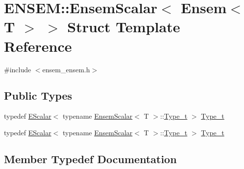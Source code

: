 \hypertarget{structENSEM_1_1EnsemScalar_3_01Ensem_3_01T_01_4_01_4}{}\section{E\+N\+S\+EM\+:\+:Ensem\+Scalar$<$ Ensem$<$ T $>$ $>$ Struct Template Reference}
\label{structENSEM_1_1EnsemScalar_3_01Ensem_3_01T_01_4_01_4}


{\ttfamily \#include $<$ensem\+\_\+ensem.\+h$>$}

\subsection*{Public Types}
\begin{DoxyCompactItemize}
\item 
typedef \mbox{\hyperlink{classENSEM_1_1EScalar}{E\+Scalar}}$<$ typename \mbox{\hyperlink{structENSEM_1_1EnsemScalar}{Ensem\+Scalar}}$<$ T $>$\+::\mbox{\hyperlink{structENSEM_1_1EnsemScalar_3_01Ensem_3_01T_01_4_01_4_a7452a3e2409e2d8a2ae3ea41eec32972}{Type\+\_\+t}} $>$ \mbox{\hyperlink{structENSEM_1_1EnsemScalar_3_01Ensem_3_01T_01_4_01_4_a7452a3e2409e2d8a2ae3ea41eec32972}{Type\+\_\+t}}
\item 
typedef \mbox{\hyperlink{classENSEM_1_1EScalar}{E\+Scalar}}$<$ typename \mbox{\hyperlink{structENSEM_1_1EnsemScalar}{Ensem\+Scalar}}$<$ T $>$\+::\mbox{\hyperlink{structENSEM_1_1EnsemScalar_3_01Ensem_3_01T_01_4_01_4_a7452a3e2409e2d8a2ae3ea41eec32972}{Type\+\_\+t}} $>$ \mbox{\hyperlink{structENSEM_1_1EnsemScalar_3_01Ensem_3_01T_01_4_01_4_a7452a3e2409e2d8a2ae3ea41eec32972}{Type\+\_\+t}}
\end{DoxyCompactItemize}


\subsection{Member Typedef Documentation}
\mbox{\label{structENSEM_1_1EnsemScalar_3_01Ensem_3_01T_01_4_01_4_a7452a3e2409e2d8a2ae3ea41eec32972}} 

